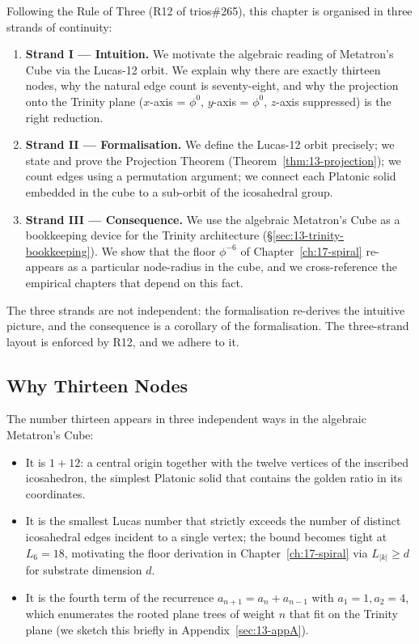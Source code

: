 Following the Rule of Three (R12 of trios\#265), this chapter is
organised in three strands of continuity:

\begin{enumerate}
\item \textbf{Strand I --- Intuition.} We motivate the algebraic
  reading of Metatron's Cube via the Lucas-12 orbit. We explain why
  there are exactly thirteen nodes, why the natural edge count is
  seventy-eight, and why the projection onto the Trinity plane
  ($x$-axis = $\phi^{0}$, $y$-axis = $\phi^{0}$, $z$-axis suppressed)
  is the right reduction.
\item \textbf{Strand II --- Formalisation.} We define the Lucas-12
  orbit precisely; we state and prove the Projection Theorem
  (Theorem~\ref{thm:13-projection}); we count edges using a
  permutation argument; we connect each Platonic solid embedded in
  the cube to a sub-orbit of the icosahedral group.
\item \textbf{Strand III --- Consequence.} We use the algebraic
  Metatron's Cube as a bookkeeping device for the Trinity
  architecture (\S\ref{sec:13-trinity-bookkeeping}). We show that
  the floor $\phi^{-6}$ of Chapter~\ref{ch:17-spiral} re-appears as
  a particular node-radius in the cube, and we cross-reference the
  empirical chapters that depend on this fact.
\end{enumerate}

The three strands are not independent: the formalisation re-derives
the intuitive picture, and the consequence is a corollary of the
formalisation. The three-strand layout is enforced by R12, and we
adhere to it.

\subsection{Why Thirteen Nodes}
\label{fa_13:sec:13-thirteen}

The number thirteen appears in three independent ways in the
algebraic Metatron's Cube:

\begin{itemize}
\item It is $1 + 12$: a central origin together with the twelve
  vertices of the inscribed icosahedron, the simplest Platonic
  solid that contains the golden ratio in its coordinates.
\item It is the smallest Lucas number that strictly exceeds the
  number of distinct icosahedral edges incident to a single vertex;
  the bound becomes tight at $L_{6} = 18$, motivating the floor
  derivation in Chapter~\ref{ch:17-spiral} via $L_{|k|} \geq d$ for
  substrate dimension $d$.
\item It is the fourth term of the recurrence
  $a_{n+1} = a_{n} + a_{n-1}$ with $a_{1} = 1, a_{2} = 4$, which
  enumerates the rooted plane trees of weight $n$ that fit on the
  Trinity plane (we sketch this briefly in
  Appendix~\ref{sec:13-appA}).
\end{itemize}

